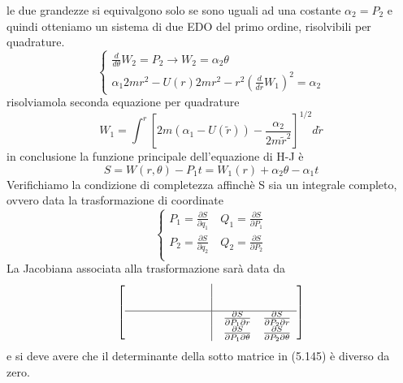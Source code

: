 le due grandezze si equivalgono solo se sono uguali ad una costante $\alpha_2 = P_2$ e quindi otteniamo un sistema di due EDO del primo ordine, risolvibili per quadrature.
\begin{equation}
\left\{\begin{array}{l}
\frac{d}{d \theta} W_2=P_2 \rightarrow W_2= \alpha_2 \theta \\
\alpha_1 2 m r^2-U(r) 2 m r^2-r^2\left(\frac{d}{d r} W_{1}\right)^2=\alpha_2
\end{array}\right.
\end{equation}
risolviamola seconda equazione per quadrature 
\begin{equation}
W_1=\int^r\left[2 m\left(\alpha_1-U(\tilde{r})\right)-\frac{\alpha_2}{2 m \tilde{r}^2}\right]^{1 / 2} d \tilde{r}
\end{equation}
in conclusione la funzione principale dell'equazione di H-J \`{e} 
\begin{equation}
	S = W(r,\theta) - P_1t = W_1(r) + \alpha_2 \theta - \alpha_1t
\end{equation}
Verifichiamo la condizione di completezza affinch\`{e} S sia un integrale completo, ovvero data la trasformazione di coordinate
\begin{equation}
\left\{\begin{array}{l}
P_1=\frac{\partial S}{\partial q_1} \quad Q_1=\frac{\partial S}{\partial P_1} \\
P_2=\frac{\partial S}{\partial q_2} \quad Q_2=\frac{\partial S}{\partial P_2}\\

\end{array}\right.
\end{equation}
La Jacobiana associata alla trasformazione sar\`{a} data da 
\begin{align}
\left [ \begin{array}{ccccc}
	\phantom{''''''''''''''''''''''} & \phantom{} & \vline & \phantom{} & \phantom{}\\
	\phantom{} & \phantom{} & \vline & \phantom{} & \phantom{}\\
	\hline
	\phantom{} & \phantom{} & \vline & \frac{\partial S}{\partial P_1 \partial r} & \frac{\partial S}{\partial P_2 \partial r} \\
	\phantom{} & \phantom{} & \vline & \frac{\partial S}{\partial P_1 \partial \theta} & \frac{\partial S}{\partial P_2 \partial \theta} \\
\end{array}
\right ]
\end{align}
e si deve avere che il determinante della sotto matrice in (5.145) \`{e} diverso da zero.

